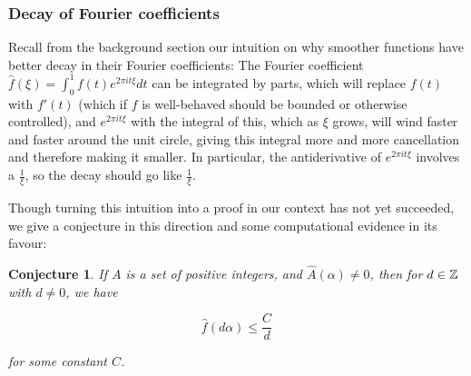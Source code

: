 \documentclass{article}
\newtheorem{conjecture}[theorem]{Conjecture}
\theoremstyle{definition}
\theoremstyle{remark}
\numberwithin{equation}{section}
\begin{document}
\subsubsection{Decay of Fourier coefficients}

Recall from the background section our intuition on why smoother
functions have better decay in their Fourier coefficients: The Fourier
coefficient $\widehat{f}(\xi) = \int_0^1 f(t) e^{2\pi i t \xi} dt$ can
be integrated by parts, which will replace $f(t)$ with $f'(t)$ (which
if $f$ is well-behaved should be bounded or otherwise controlled), and
$e^{2\pi i t \xi}$ with the integral of this, which as $\xi$ grows,
will wind faster and faster around the unit circle, giving this
integral more and more cancellation and therefore making it smaller.
In particular, the antiderivative of $e^{2\pi i t \xi}$ involves a
$\frac{1}{\xi}$, so the decay should go like $\frac{1}{\xi}$.

Though turning this intuition into a proof in our context has not yet
succeeded, we give a conjecture in this direction and some
computational evidence in its favour: 

\begin{conjecture}\label{conj:decay} 
  If $A$ is a \relevant set of positive integers, and
  $\widehat{A}(\alpha) \neq 0$, then for $d \in \mathbb{Z}$ with $d \neq 0$,
  we have

  \[\widehat{f}(d\alpha) \leq \frac{C}{d}\]

  for some constant $C$.  
\end{conjecture}





\end{document}
